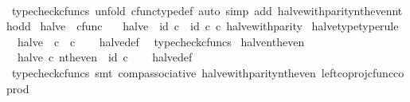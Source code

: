 \begin{isabellebody}
\ \ \ \ \isamarkupfalse%
\ {\isacharparenleft}{\kern0pt}typecheck{\isacharunderscore}{\kern0pt}cfuncs{\isacharcomma}{\kern0pt}\ unfold\ cfunc{\isacharunderscore}{\kern0pt}type{\isacharunderscore}{\kern0pt}def{\isacharcomma}{\kern0pt}\ auto\ simp\ add{\isacharcolon}{\kern0pt}\ halve{\isacharunderscore}{\kern0pt}with{\isacharunderscore}{\kern0pt}parity{\isacharunderscore}{\kern0pt}nth{\isacharunderscore}{\kern0pt}even{\isacharunderscore}{\kern0pt}nth{\isacharunderscore}{\kern0pt}odd{\isacharparenright}{\kern0pt}\isanewline
{}\isamarkupfalse%
%
\endisatagproof
{\isafoldproof}%
%
\isadelimproof
\isanewline
%
\endisadelimproof
\isanewline
{}\isamarkupfalse%
\ halve\ {\isacharcolon}{\kern0pt}{\isacharcolon}{\kern0pt}\ {\isachardoublequoteopen}cfunc{\isachardoublequoteclose}\ \isanewline
\ \ {\isachardoublequoteopen}halve\ {\isacharequal}{\kern0pt}\ {\isacharparenleft}{\kern0pt}id\ {\isasymnat}\isactrlsub c\ {\isasymamalg}\ id\ {\isasymnat}\isactrlsub c{\isacharparenright}{\kern0pt}\ {\isasymcirc}\isactrlsub c\ halve{\isacharunderscore}{\kern0pt}with{\isacharunderscore}{\kern0pt}parity{\isachardoublequoteclose}\isanewline
\isanewline
{}\isamarkupfalse%
\ halve{\isacharunderscore}{\kern0pt}type{\isacharbrackleft}{\kern0pt}type{\isacharunderscore}{\kern0pt}rule{\isacharbrackright}{\kern0pt}{\isacharcolon}{\kern0pt}\isanewline
\ \ {\isachardoublequoteopen}halve\ {\isacharcolon}{\kern0pt}\ {\isasymnat}\isactrlsub c\ {\isasymrightarrow}\ {\isasymnat}\isactrlsub c{\isachardoublequoteclose}\isanewline
%
\isadelimproof
\ \ %
\endisadelimproof
%
\isatagproof
{}\isamarkupfalse%
\ halve{\isacharunderscore}{\kern0pt}def\ \isamarkupfalse%
\ typecheck{\isacharunderscore}{\kern0pt}cfuncs%
\endisatagproof
{\isafoldproof}%
%
\isadelimproof
\isanewline
%
\endisadelimproof
\isanewline
{}\isamarkupfalse%
\ halve{\isacharunderscore}{\kern0pt}nth{\isacharunderscore}{\kern0pt}even{\isacharcolon}{\kern0pt}\isanewline
\ \ {\isachardoublequoteopen}halve\ {\isasymcirc}\isactrlsub c\ nth{\isacharunderscore}{\kern0pt}even\ {\isacharequal}{\kern0pt}\ id\ {\isasymnat}\isactrlsub c{\isachardoublequoteclose}\isanewline
%
\isadelimproof
\ \ %
\endisadelimproof
%
\isatagproof
{}\isamarkupfalse%
\ halve{\isacharunderscore}{\kern0pt}def\ \isamarkupfalse%
\ {\isacharparenleft}{\kern0pt}typecheck{\isacharunderscore}{\kern0pt}cfuncs{\isacharcomma}{\kern0pt}\ smt\ comp{\isacharunderscore}{\kern0pt}associative{}\ halve{\isacharunderscore}{\kern0pt}with{\isacharunderscore}{\kern0pt}parity{\isacharunderscore}{\kern0pt}nth{\isacharunderscore}{\kern0pt}even\ left{\isacharunderscore}{\kern0pt}coproj{\isacharunderscore}{\kern0pt}cfunc{\isacharunderscore}{\kern0pt}coprod{\isacharparenright}{\kern0pt}%

\end{isabellebody}
